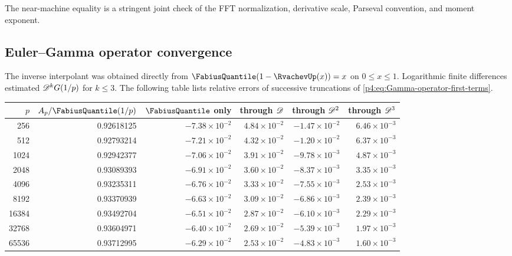 \documentclass[11pt,oneside]{article}
\theoremstyle{definition}
\theoremstyle{remark}
\begin{document}
The near-machine equality is a stringent joint check of the FFT normalization, derivative
scale, Parseval convention, and moment exponent.

\subsection{Euler--Gamma operator convergence}

The inverse interpolant was obtained directly from
$\FabiusQuantile(1-\RvachevUp(x))=x$ on $0\leq x\leq1$.  Logarithmic finite differences estimated
$\mathscr D^kG(1/p)$ for $k\leq3$.  The following table lists relative errors of successive
truncations of \eqref{p4:eq:Gamma-operator-first-terms}.

\begin{center}
\small
\begin{tabular}{@{}rrrrrr@{}}
\toprule
$p$ & $A_p/\FabiusQuantile(1/p)$ & $\FabiusQuantile$ only &
through $\mathscr D$ & through $\mathscr D^2$ & through $\mathscr D^3$\\
\midrule
256   & 0.92618125 & $-7.38\!\times10^{-2}$ & $4.84\!\times10^{-2}$ & $-1.47\!\times10^{-2}$ & $6.46\!\times10^{-3}$\\
512   & 0.92793214 & $-7.21\!\times10^{-2}$ & $4.32\!\times10^{-2}$ & $-1.20\!\times10^{-2}$ & $6.37\!\times10^{-3}$\\
1024  & 0.92942377 & $-7.06\!\times10^{-2}$ & $3.91\!\times10^{-2}$ & $-9.78\!\times10^{-3}$ & $4.87\!\times10^{-3}$\\
2048  & 0.93089393 & $-6.91\!\times10^{-2}$ & $3.60\!\times10^{-2}$ & $-8.37\!\times10^{-3}$ & $3.35\!\times10^{-3}$\\
4096  & 0.93235311 & $-6.76\!\times10^{-2}$ & $3.33\!\times10^{-2}$ & $-7.55\!\times10^{-3}$ & $2.53\!\times10^{-3}$\\
8192  & 0.93370939 & $-6.63\!\times10^{-2}$ & $3.09\!\times10^{-2}$ & $-6.86\!\times10^{-3}$ & $2.39\!\times10^{-3}$\\
16384 & 0.93492704 & $-6.51\!\times10^{-2}$ & $2.87\!\times10^{-2}$ & $-6.10\!\times10^{-3}$ & $2.29\!\times10^{-3}$\\
32768 & 0.93604971 & $-6.40\!\times10^{-2}$ & $2.69\!\times10^{-2}$ & $-5.39\!\times10^{-3}$ & $1.97\!\times10^{-3}$\\
65536 & 0.93712995 & $-6.29\!\times10^{-2}$ & $2.53\!\times10^{-2}$ & $-4.83\!\times10^{-3}$ & $1.60\!\times10^{-3}$\\
\bottomrule
\end{tabular}
\end{center}
\end{document}
